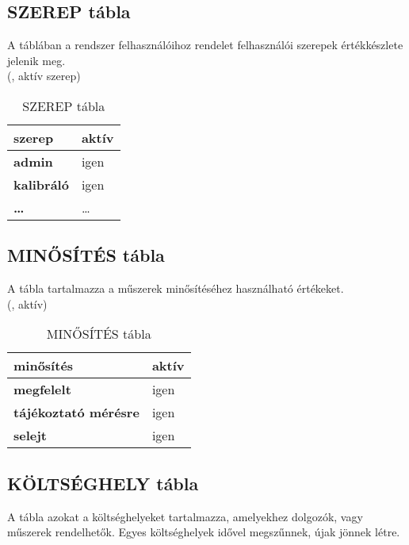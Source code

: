 
\subsection{SZEREP tábla}
A  táblában a rendszer felhasználóihoz rendelet felhasználói 
szerepek értékkészlete jelenik meg.\\

(, aktív szerep)

\begin{table}[ht!]
\centering
{\footnotesize \begin{tabular}[t]{|l|l|}
\hline
 \textbf{szerep}&aktív\\\hline
 \textbf{admin}&igen\\
 \textbf{kalibráló}&igen\\
 \textbf{\dots}&\dots\\
\end{tabular}}
\caption{SZEREP tábla} \label{tabSZEREP}
\end{table}


\subsection{MINŐSÍTÉS tábla}
A tábla tartalmazza a műszerek minősítéséhez használható értékeket.\\

(, aktív)
\begin{table}[ht!]
\centering
\begin{footnotesize}
\begin{tabular}[t]{|l|l|}
\hline
 \textbf{minősítés}&aktív\\\hline
 \textbf{megfelelt}&igen\\
 \textbf{tájékoztató mérésre}&igen\\
 \textbf{selejt}&igen\\
 \hline
\end{tabular}
\end{footnotesize}
\caption{MINŐSÍTÉS tábla} \label{tabMINOSITES}
\end{table}


\subsection{KÖLTSÉGHELY tábla}
A tábla azokat a költséghelyeket tartalmazza, amelyekhez dolgozók, vagy 
műszerek rendelhetők. Egyes költséghelyek idővel megszűnnek, újak jönnek
létre.\\

